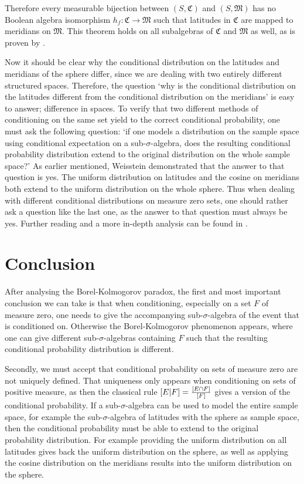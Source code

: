 \documentclass[a4paper]{report}
\theoremstyle{plain}
\theoremstyle{definition}
\theoremstyle{remark}
\numberwithin{equation}{chapter}
\let\P\relax
\DeclareMathOperator{\P}{\mathbb{P}}
\DeclareMathOperator{\1}{\mathbbm{1}}
\begin{document}
Therefore every measurable bijection between $(S,\mathfrak{C})$ and $(S,\mathfrak{M})$ has no Boolean algebra isomorphism $h_f\colon\mathfrak{C}\to\mathfrak{M}$ such that latitudes in $\mathfrak{C}$ are mapped to meridians on $\mathfrak{M}$. This theorem holds on all subalgebras of $\mathfrak{C}$ and $\mathfrak{M}$ as well, as is proven by \cite{Gyenis17}.

Now it should be clear why the conditional distribution on the latitudes and meridians of the sphere differ, since we are dealing with two entirely different structured spaces. Therefore, the question `why is the conditional distribution on the latitudes different from the conditional distribution on the meridians' is easy to answer; difference in spaces. To verify that two different methods of conditioning on the same set yield to the correct conditional probability, one must ask the following question: `if one models a distribution on the sample space using conditional expectation on a sub-$\sigma$-algebra, does the resulting conditional probability distribution extend to the original distribution on the whole sample space?' As earlier mentioned, Weisstein \cite{Weisstein} demonstrated that the answer to that question is yes. The uniform distribution on latitudes and the cosine on meridians both extend to the uniform distribution on the whole sphere. Thus when dealing with different conditional distributions on measure zero sets, one should rather ask a question like the last one, as the answer to that question must always be yes. Further reading and a more in-depth analysis can be found in \cite{Gyenis17}.


\section{Conclusion}
After analysing the Borel-Kolmogorov paradox, the first and most important conclusion we can take is that when conditioning, especially on a set $F$ of measure zero, one needs to give the accompanying sub-$\sigma$-algebra of the event that is conditioned on. Otherwise the Borel-Kolmogorov phenomenon appears, where one can give different sub-$\sigma$-algebras containing $F$ such that the resulting conditional probability distribution is different.

Secondly, we must accept that conditional probability on sets of measure zero are not uniquely defined. That uniqueness only appears when conditioning on sets of positive measure, as then the classical rule $\P[E|F]=\frac{\P[E\cap F]}{\P[F]}$ gives a version of the conditional probability. If a sub-$\sigma$-algebra can be used to model the entire sample space, for example the sub-$\sigma$-algebra of latitudes with the sphere as sample space, then the conditional probability must be able to extend to the original probability distribution. For example providing the uniform distribution on all latitudes gives back the uniform distribution on the sphere, as well as applying the cosine distribution on the meridians results into the uniform distribution on the sphere.
\end{document}

